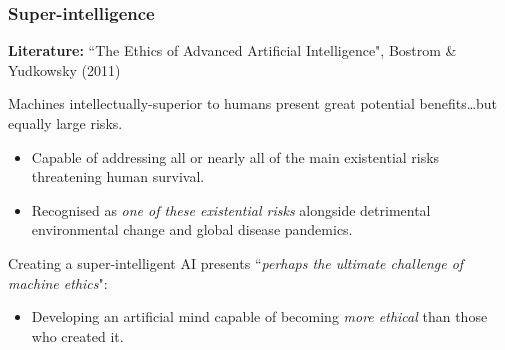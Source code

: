 \documentclass[10pt, compress]{beamer}
\begin{document}
\begin{frame}[fragile]
  \frametitle{Super-intelligence}
  
   \small{ 
   
   \textbf{Literature:} ``The Ethics of Advanced Artificial Intelligence", Bostrom \& Yudkowsky (2011)
   
   \vspace{10pt}
   
     Machines intellectually-superior to humans present great potential benefits\ldots but equally large risks.
          
     \begin{itemize}
   	\item Capable of addressing all or nearly all of the main existential risks threatening human survival.  
   	\item Recognised as \textit{one of these existential risks} alongside detrimental environmental change and global disease pandemics.
   \end{itemize}
   
   \vspace{10pt}
   
   Creating a super-intelligent AI presents ``\textit{perhaps the ultimate challenge of machine ethics}":
      
   \begin{itemize}
   	\item[] Developing an artificial mind capable of becoming \textit{more ethical} than those who created it.
   \end{itemize}
  
   
     }

\end{frame}
\end{document}
